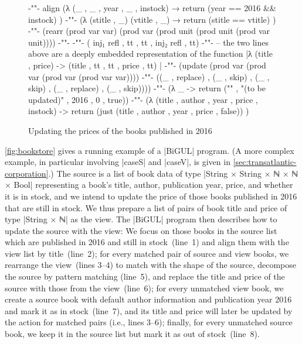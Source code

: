 \documentclass{sigplanconf}
\newcommand{\lno}[1]{\text{\scriptsize #1\quad}}
\newcommand{\beforefigure}{\setlength{\mathindent}{0em}}
\begin{document}
\begin{figure}
\beforefigure
\begin{code}
{-"\lno1"-}  align  (λ { (_ , _ , year , _ , instock) → return (year == 2016 && instock) })
{-"\lno2"-}         (λ { (stitle , _) (vtitle , _) → return (stitle == vtitle) })
{-"\lno3"-}         (rearr  (prod var var)  (prod  var (prod    unit (prod   unit (prod  var          unit))))
{-"\lno4"-}         {-""-}                  (      inj₁ refl ,  tt ,         tt ,        inj₂ refl ,  tt)
                    {-""-}  -- the two lines above are a deeply embedded representation of the function |λ { (title , price) -> (title , tt , tt , price , tt) }|
{-"\lno5"-}                 (update  (prod  var (prod        var (prod     var (prod      var              var))))
{-"\lno6"-}                          ((_ ,  replace) , (_ ,  skip) , (_ ,  skip) , (_ ,   replace) , (_ ,  skip))))
{-"\lno7"-}         (λ _ -> return ("" , "(to be updated)" , 2016 , 0 , true))
{-"\lno8"-}         (λ { (title , author , year , price , instock) -> return (just (title , author , year , price , false)) })
\end{code}
\caption{Updating the prices of the books published in 2016}
\label{fig:bookstore}
\end{figure}

\autoref{fig:bookstore} gives a running example of a |BiGUL| program.
(A more complex example, in particular involving |caseS| and |caseV|, is given in \autoref{sec:transatlantic-corporation}.)
The source is a list of book data of type |String × String × ℕ × ℕ × Bool| representing a book's title, author, publication year, price, and whether it is in stock, and we intend to update the price of those books published in 2016 that are still in stock.
We thus prepare a list of pairs of book title and price of type |String × ℕ| as the view.
The |BiGUL| program then describes how to update the source with the view:
We focus on those books in the source list which are published in 2016 and still in stock~(line~1) and align them with the view list by title~(line~2);
for every matched pair of source and view books, we rearrange the view~(lines 3--4) to match with the shape of the source, decompose the source by pattern matching (line~5), and replace the title and price of the source with those from the view~(line~6);
for every unmatched view book, we create a source book with default author information and publication year 2016 and mark it as in stock~(line~7), and its title and price will later be updated by the action for matched pairs (i.e., lines 3--6);
finally, for every unmatched source book, we keep it in the source list but mark it as out of stock~(line~8).
\end{document}

